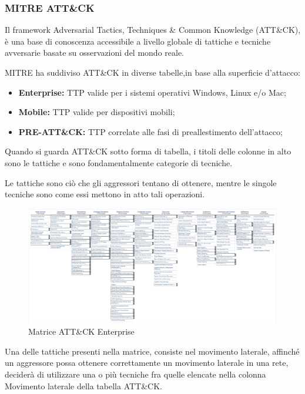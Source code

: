 \newpage

\subsubsection{MITRE ATT\&CK}

Il framework Adversarial Tactics, Techniques \& Common Knowledge (ATT\&CK), è una base di conoscenza accessibile a livello globale di tattiche e tecniche avversarie basate su osservazioni del mondo reale.\par 
MITRE ha suddiviso ATT\&CK in diverse tabelle,in base alla superficie d’attacco:

\begin{itemize}
    \item\textbf{Enterprise:} TTP valide per i sistemi operativi Windows, Linux e/o Mac;
    \item\textbf{Mobile:} TTP valide per dispositivi mobili;
    \item\textbf{PRE-ATT\&CK:} TTP correlate alle fasi di preallestimento dell'attacco;
\end{itemize}

Quando si guarda ATT\&CK sotto forma di tabella, i titoli delle colonne in alto sono le tattiche e sono fondamentalmente categorie di tecniche.\par
Le tattiche sono ciò che gli aggressori tentano di ottenere, mentre le singole tecniche sono come essi mettono in atto tali operazioni.

\begin{figure}[h]
\begin{center}
\includegraphics[width=0.95\columnwidth]{images/2_architettura_img/tabellaATT&CK.png}
\end{center}
\caption{Matrice ATT\&CK Enterprise}
\label{fig:Matrice ATTCK Enterprise }
\end{figure}

Una delle tattiche presenti nella matrice, consiste nel movimento laterale, affinché un aggressore possa ottenere correttamente un movimento laterale in una rete, deciderà di utilizzare una o più tecniche fra quelle elencate nella colonna Movimento laterale della tabella ATT\&CK.\par

